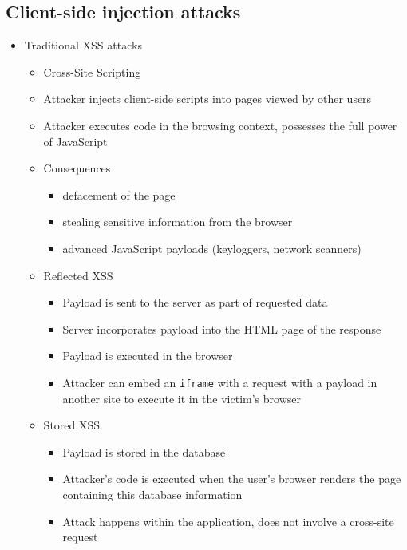 \documentclass[12pt,titlepage,a4paper]{report}
\begin{document}
	\subsection{Client-side injection attacks}
	\begin{itemize}
		\item Traditional XSS attacks
		\begin{itemize}
			\item Cross-Site Scripting
			\item Attacker injects client-side scripts into pages viewed by other users
			\item Attacker executes code in the browsing context, possesses the full power of JavaScript
			\item Consequences
			\begin{itemize}
				\item defacement of the page
				\item stealing sensitive information from the browser
				\item advanced JavaScript payloads (keyloggers, network scanners)
			\end{itemize}
			\item Reflected XSS
			\begin{itemize}
				\item Payload is sent to the server as part of requested data
				\item Server incorporates payload into the HTML page of the response
				\item Payload is executed in the browser
				\item Attacker can embed an \texttt{iframe} with a request with a payload in another site to execute it in the victim's browser
			\end{itemize}
			\item Stored XSS
			\begin{itemize}
				\item Payload is stored in the database
				\item Attacker's code is executed when the user's browser renders the page containing this database information
				\item Attack happens within the application, does not involve a cross-site request
			\end{itemize}
		\end{itemize}
	

\end{itemize}
\end{document}
